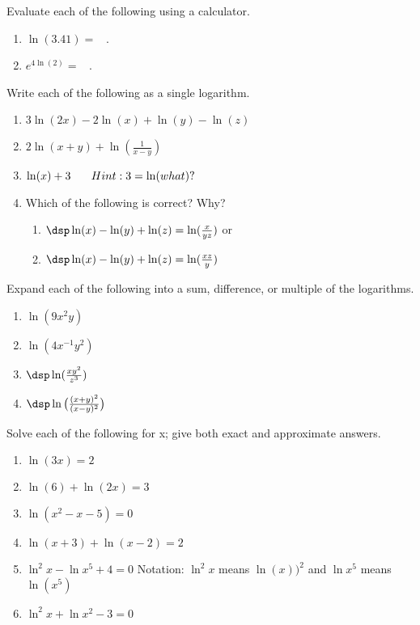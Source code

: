 \begin{prb} \label{e2}
Evaluate each of the following using a calculator.
    \begin{enumerate}
    \item $\ln(3.41) = $ \hrulefill\ .
    \item $e^{4\ln(2)} = $ \hrulefill\ .
    \end{enumerate}
\end{prb}


\begin{prb} \label{e3}
Write each of the following as a single logarithm.
    \begin{enumerate}
    \item $3\ln(2x) - 2\ln(x) + \ln(y) - \ln(z)$
    \item $2\ln(x+y) + \ln(\frac{1}{x-y})$
    \item $\ln(x) + 3 \hspace{.25in} Hint: 3 = \ln(what)?$
    \item Which of the following is correct?  Why? 
        \begin{enumerate}
           \item $\dsp \ln(x) - \ln(y) + \ln(z) = \ln(\frac{x}{yz})$ or \\
           \item $\dsp \ln(x) - \ln(y) + \ln(z) = \ln(\frac{xz}{y})$
        \end{enumerate}
    \end{enumerate}
\end{prb}

\begin{prb} \label{e4}
Expand each of the following into a sum, difference, or multiple of the logarithms.

    \begin{enumerate}
    \item $\ln(9x^2y)$
    \item $\ln(4x^{-1}y^2)$
    \item $\dsp \ln(\frac{xy^2}{z^3})$
    \item $\dsp \ln\big( \frac{ (x+y)^2 }{ (x-y)^2 } \big)$
    \end{enumerate}

\end{prb}

\begin{prb} \label{e5}
Solve each of the following for x; give both exact and approximate answers.
    \begin{enumerate}
    \item $\ln(3x) = 2$
    \item $\ln(6) + \ln(2x) = 3$
    \item $\ln(x^2-x-5)=0$
    \item $\ln(x+3) + \ln(x-2)=2$
    \item $\ln ^2x-\ln x^5 + 4 = 0$ \hspace{.25in} Notation: $\ln ^2x$  means $\ln(x) )^2$ and $\ln x^5$ means $\ln(x^5)$
    \item $\ln ^2x+\ln x^2-3=0$
    \end{enumerate}
\end{prb}

